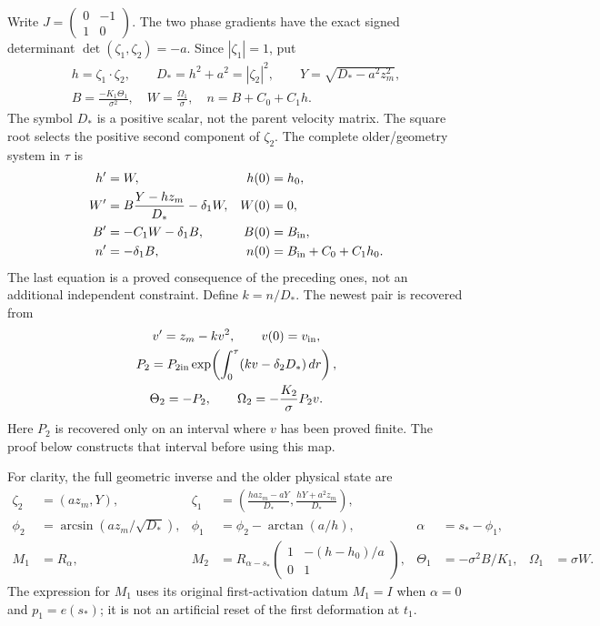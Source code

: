 Write $J=\left(\begin{smallmatrix}0&-1\\1&0\end{smallmatrix}\right)$.
The two phase gradients have the exact signed determinant
$\det(\zeta_1,\zeta_2)=-a$. Since $|\zeta_1|=1$, put
\[
 \begin{gathered}
 h=\zeta_1\cdot\zeta_2,\qquad
 D_*=h^2+a^2=|\zeta_2|^2,\qquad
 Y=\sqrt{D_*-a^2z_m^2},\\
 B=\frac{-K_1\Theta_1}{\sigma^2},\quad
 W=\frac{\Omega_1}{\sigma},\quad
 n=B+C_0+C_1h.
 \end{gathered}
\]
The symbol $D_*$ is a positive scalar, not the parent velocity matrix.
The square root selects the positive second component of $\zeta_2$.
The complete older/geometry system in $\tau$ is
\begin{equation}\label{sr:closed}
 \begin{aligned}
 h'&=W,&h(0)&=h_0,\\
 W'&=B\frac{Y-hz_m}{D_*}-\delta_1W,&W(0)&=0,\\
 B'&=-C_1W-\delta_1B,&B(0)&=B_{\rm in},\\
 n'&=-\delta_1B,&n(0)&=B_{\rm in}+C_0+C_1h_0.
 \end{aligned}
\end{equation}
The last equation is a proved consequence of the preceding ones, not
an additional independent constraint. Define $k=n/D_*$. The newest
pair is recovered from
\begin{equation}\label{sr:newest}
 \begin{gathered}
 v'=z_m-kv^2,\qquad v(0)=v_{\rm in},\\
 P_2=P_{2\rm in}\exp\!\left(\int_0^\tau(kv-\delta_2D_*)\,dr\right),\\
 \Theta_2=-P_2,\qquad
 \Omega_2=-\frac{K_2}{\sigma}P_2v.
 \end{gathered}
\end{equation}
Here $P_2$ is recovered only on an interval where $v$ has been proved
finite. The proof below constructs that interval before using this map.

For clarity, the full geometric inverse and the older physical state are
\begin{align}\label{sr:inverse}
 \zeta_2&=(az_m,Y),&
 \zeta_1&=\left(\frac{haz_m-aY}{D_*},
                    \frac{hY+a^2z_m}{D_*}\right),\\
 \phi_2&=\arcsin(az_m/\sqrt{D_*}),&
 \phi_1&=\phi_2-\arctan(a/h),&\alpha&=s_*-\phi_1,\nonumber\\
 M_1&=R_\alpha,&
 M_2&=R_{\alpha-s_*}
       \begin{pmatrix}1&-(h-h_0)/a\\0&1\end{pmatrix},&
 \Theta_1&=-\sigma^2B/K_1,&\Omega_1&=\sigma W.\nonumber
\end{align}
The expression for $M_1$ uses its original first-activation datum
$M_1=I$ when $\alpha=0$ and $p_1=e(s_*)$; it is not an artificial
reset of the first deformation at $t_1$.

